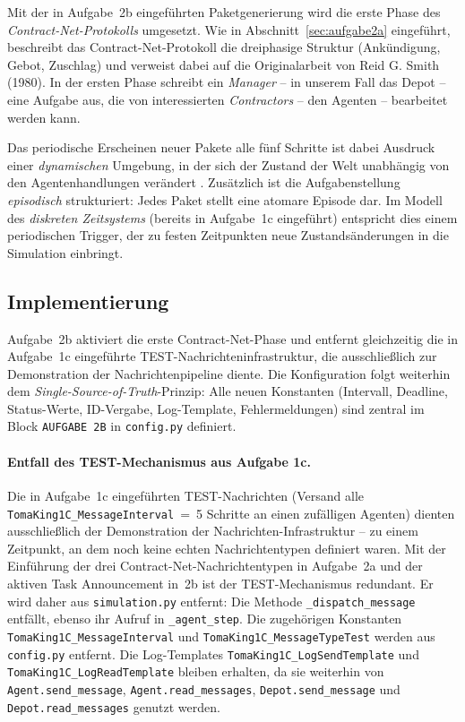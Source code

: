 Mit der in Aufgabe~2b eingeführten Paketgenerierung wird die erste Phase des \textit{Contract-Net-Protokolls} umgesetzt. Wie in Abschnitt~\ref{sec:aufgabe2a} eingeführt, beschreibt das Contract-Net-Protokoll die dreiphasige Struktur (Ankündigung, Gebot, Zuschlag) und verweist dabei auf die Originalarbeit von Reid G. Smith (1980). In der ersten Phase schreibt ein \textit{Manager} -- in unserem Fall das Depot -- eine Aufgabe aus, die von interessierten \textit{Contractors} -- den Agenten -- bearbeitet werden kann.

Das periodische Erscheinen neuer Pakete alle fünf Schritte ist dabei Ausdruck einer \textit{dynamischen} Umgebung, in der sich der Zustand der Welt unabhängig von den Agentenhandlungen verändert \cite[S. 12]{5}. Zusätzlich ist die Aufgabenstellung \textit{episodisch} strukturiert: Jedes Paket stellt eine atomare Episode dar. Im Modell des \textit{diskreten Zeitsystems} (bereits in Aufgabe~1c eingeführt) entspricht dies einem periodischen Trigger, der zu festen Zeitpunkten neue Zustandsänderungen in die Simulation einbringt.

\subsection{Implementierung}

Aufgabe~2b aktiviert die erste Contract-Net-Phase und entfernt gleichzeitig die in Aufgabe~1c eingeführte TEST-Nachrichteninfrastruktur, die ausschließlich zur Demonstration der Nachrichtenpipeline diente. Die Konfiguration folgt weiterhin dem \textit{Single-Source-of-Truth}-Prinzip: Alle neuen Konstanten (Intervall, Deadline, Status-Werte, ID-Vergabe, Log-Template, Fehlermeldungen) sind zentral im Block \texttt{AUFGABE 2B} in \texttt{config.py} definiert.

\paragraph{Entfall des TEST-Mechanismus aus Aufgabe 1c.}
Die in Aufgabe~1c eingeführten TEST-Nachrichten (Versand alle \\ \texttt{TomaKing1C\_MessageInterval}~=~5 Schritte an einen zufälligen Agenten) dienten ausschließlich der Demonstration der Nachrichten-Infrastruktur -- zu einem Zeitpunkt, an dem noch keine echten Nachrichtentypen definiert waren. Mit der Einführung der drei Contract-Net-Nachrichtentypen in Aufgabe~2a und der aktiven Task Announcement in~2b ist der TEST-Mechanismus redundant. Er wird daher aus \texttt{simulation.py} entfernt: Die Methode \texttt{\_dispatch\_message} entfällt, ebenso ihr Aufruf in \texttt{\_agent\_step}. Die zugehörigen Konstanten \\ \texttt{TomaKing1C\_MessageInterval} und \texttt{TomaKing1C\_MessageTypeTest} werden aus \texttt{config.py} entfernt. Die Log-Templates \texttt{TomaKing1C\_LogSendTemplate} und \texttt{TomaKing1C\_LogReadTemplate} bleiben erhalten, da sie weiterhin von \texttt{Agent.send\_message}, \texttt{Agent.read\_messages}, \texttt{Depot.send\_message} und \texttt{Depot.read\_messages} genutzt werden.

